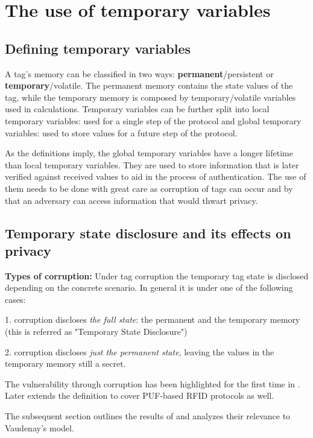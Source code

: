 \chapter{The use of temporary variables}

\section{Defining temporary variables}

    A tag's memory can be classified in two ways: \textbf{permanent}/persistent or \textbf{temporary}/volatile. The permanent memory contains the state values of the tag, while the temporary memory is
    composed by temporary/volatile variables used in calculations. Temporary variables can be further split into local temporary variables: used for a single step of the protocol
    and global temporary variables: used to store values for a future step of the protocol.

    As the definitions imply, the global temporary variables have a longer lifetime than local temporary variables. They are used to
    store information that is later 
    verified against received values to aid in the process of authentication. The use of them needs to be done with great care as corruption of 
    tags can occur and by that an adversary can access information that would thwart privacy.

\section{Temporary state disclosure and its effects on privacy}

    \textbf{Types of corruption:}
    Under tag corruption the temporary tag state is disclosed depending on the concrete scenario. In general it is
    under one of the following cases:

    1. corruption discloses \textit{the full state}: the permanent and the temporary memory (this is referred as "Temporary State Disclosure")

    2. corruption discloses \textit{just the permanent state}, leaving the values in the temporary memory still a secret.

    The vulnerability through corruption has been highlighted for the first time in \cite{Impossibility_results}. Later \cite{Tiplea} 
    extends the definition to cover PUF-based RFID protocols as well. 

    The subsequent section outlines the results of \cite{Impossibility_results} and analyzes their relevance to Vaudenay's model.

